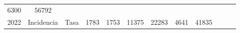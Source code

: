 \begin{tabular}{ccc|cccccc|lll}
		\multicolumn{1}{c|}{\cellcolor[HTML]{C1EFC0}6300} &
		\cellcolor[HTML]{C1EFC0}56792 &
		&
		&
		\\ \cline{3-9}
		\multicolumn{1}{|c|}{\multirow{-5}{*}{\cellcolor[HTML]{C1EFC0}2022}} &
		\multicolumn{1}{c|}{\cellcolor[HTML]{C1EFC0}Incidencia} &
		\cellcolor[HTML]{C1EFC0}Tasa &
		\multicolumn{1}{c|}{\cellcolor[HTML]{C1EFC0}1783} &
		\multicolumn{1}{c|}{\cellcolor[HTML]{C1EFC0}1753} &
		\multicolumn{1}{c|}{\cellcolor[HTML]{C1EFC0}11375} &
		\multicolumn{1}{c|}{\cellcolor[HTML]{C1EFC0}22283} &
		\multicolumn{1}{c|}{\cellcolor[HTML]{C1EFC0}4641} &
		\cellcolor[HTML]{C1EFC0}41835 &
		&
		&
		\\ \cline{1-1} \cline{3-9}
	\end{tabular}